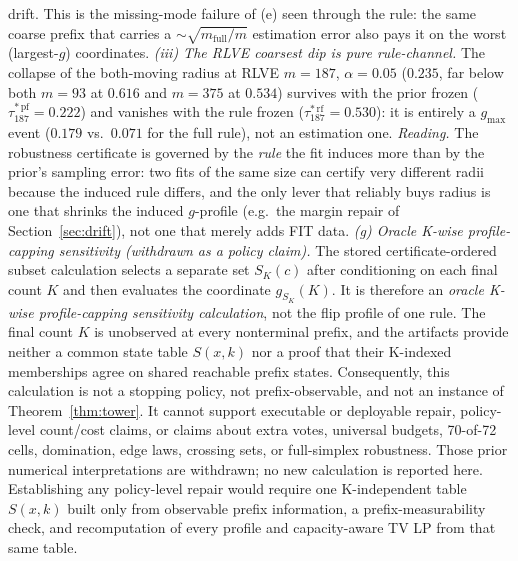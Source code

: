 \documentclass{article}
\theoremstyle{definition}
\theoremstyle{remark}
\begin{document}
drift. This is the missing-mode failure of (e) seen through the rule:
the same coarse prefix that carries a $\sim\!\sqrt{m_{\mathrm{full}}/m}$
estimation error also pays it on the worst (largest-$g$) coordinates.
\emph{(iii) The RLVE coarsest dip is pure rule-channel.} The collapse of
the both-moving radius at RLVE $m{=}187$, $\alpha{=}0.05$ ($0.235$, far
below both $m{=}93$ at $0.616$ and $m{=}375$ at $0.534$) survives with
the prior frozen ($\tau^{*\,\mathrm{pf}}_{187}=0.222$) and vanishes with
the rule frozen ($\tau^{*\,\mathrm{rf}}_{187}=0.530$): it is entirely a
$g_{\max}$ event ($0.179$ vs.\ $0.071$ for the full rule), not an
estimation one. \emph{Reading.} The robustness certificate is governed by
the \emph{rule} the fit induces more than by the prior's sampling error:
two fits of the same size can certify very different radii because the
induced rule differs, and the only lever that reliably buys radius is one
that shrinks the induced $g$-profile (e.g.\ the margin repair of
Section~\ref{sec:drift}), not one that merely adds FIT data.
\emph{(g) Oracle K-wise profile-capping sensitivity (withdrawn as a policy
claim).} The stored certificate-ordered subset calculation selects a separate
set $S_K(c)$ after conditioning on each final count $K$ and then evaluates the
coordinate $g_{S_K}(K)$. It is therefore an \emph{oracle K-wise
profile-capping sensitivity calculation}, not the flip profile of one rule.
The final count $K$ is unobserved at every nonterminal prefix, and the
artifacts provide neither a common state table $S(x,k)$ nor a proof that their
K-indexed memberships agree on shared reachable prefix states. Consequently,
this calculation is not a stopping policy, not prefix-observable, and not an
instance of Theorem~\ref{thm:tower}. It cannot support executable or
deployable repair, policy-level count/cost claims, or claims about extra votes,
universal budgets, 70-of-72 cells, domination, edge laws, crossing sets, or
full-simplex robustness. Those prior numerical interpretations are withdrawn;
no new calculation is reported here. Establishing any policy-level repair
would require one K-independent table $S(x,k)$ built only from observable
prefix information, a prefix-measurability check, and recomputation of every
profile and capacity-aware TV LP from that same table.
\end{document}
